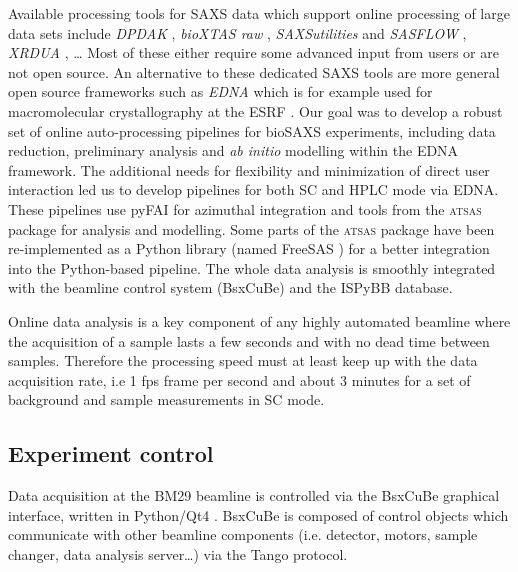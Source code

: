\documentclass[preprint,pdf]{iucr}              %
\begin{document}
Available processing tools for SAXS data which support online processing of
large data sets include \textit{DPDAK} \cite{DPDAK}, \textit{bioXTAS raw}
\cite{BioXTASraw}, \textit{SAXSutilities} \cite{SAXSUtilities} and
\textit{SASFLOW} \cite{X33P,P12},  \textit{XRDUA} \cite{xrdua}, \ldots
Most of these either require some advanced input from users or are not open source.
An alternative to these dedicated SAXS tools are more general open source frameworks such as
\textit{EDNA} which is for example used for macromolecular crystallography at
the ESRF \cite{EDNA}.
Our goal was to develop a robust set of online auto-processing pipelines
for bioSAXS experiments, including data reduction, preliminary analysis and
\textit{ab initio} modelling  within the EDNA framework.
The additional needs for flexibility and minimization of
direct user interaction led us to develop pipelines for both SC and HPLC mode
via EDNA.
These pipelines use pyFAI for azimuthal integration \cite{pyFAI} and tools
from the \textsc{atsas} package \cite{ATSAS1,ATSAS2} for analysis and modelling.
Some parts of the \textsc{atsas} package have been re-implemented as a Python
library (named FreeSAS \cite{freesas}) for a better integration into the
Python-based pipeline.
The whole data analysis is smoothly integrated with the beamline control system
(BsxCuBe) and the ISPyBB \cite{ISPYBB} database.


Online data analysis is a key component of any highly automated beamline
where the acquisition of a sample lasts a few seconds and with no dead time
between samples.
Therefore the processing speed must at least keep up with the data acquisition
rate, i.e 1 fps frame per second and about 3 minutes for a set of background and
sample measurements in SC mode.


\subsection{Experiment control}
Data acquisition at the BM29 beamline is controlled via the BsxCuBe
graphical interface, written in Python/Qt4 \cite{pyqt}.
BsxCuBe is composed of control objects which communicate with other beamline
components (i.e. detector, motors, sample changer, data analysis server\ldots)
via the Tango protocol\cite{tango}.

\end{document}
